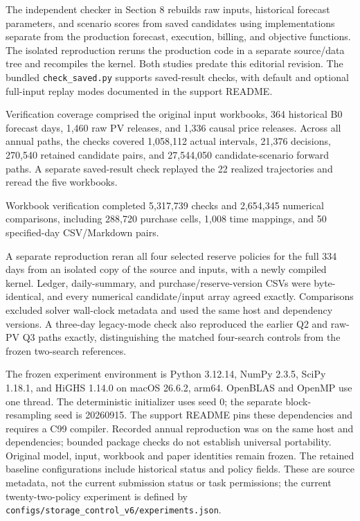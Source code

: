 The independent checker in Section 8 rebuilds raw inputs, historical forecast parameters, and scenario scores from saved candidates using implementations separate from the production forecast, execution, billing, and objective functions. The isolated reproduction reruns the production code in a separate source/data tree and recompiles the kernel. Both studies predate this editorial revision. The bundled \nolinkurl{check_saved.py} supports saved-result checks, with default and optional full-input replay modes documented in the support README.

Verification coverage comprised the original input workbooks, 364 historical B0 forecast days, 1,460 raw PV releases, and 1,336 causal price releases. Across all annual paths, the checks covered 1,058,112 actual intervals, 21,376 decisions, 270,540 retained candidate pairs, and 27,544,050 candidate-scenario forward paths. A separate saved-result check replayed the 22 realized trajectories and reread the five workbooks.

Workbook verification completed 5,317,739 checks and 2,654,345 numerical comparisons, including 288,720 purchase cells, 1,008 time mappings, and 50 specified-day CSV/Markdown pairs.

A separate reproduction reran all four selected reserve policies for the full 334 days from an isolated copy of the source and inputs, with a newly compiled kernel. Ledger, daily-summary, and purchase/reserve-version CSVs were byte-identical, and every numerical candidate/input array agreed exactly. Comparisons excluded solver wall-clock metadata and used the same host and dependency versions. A three-day legacy-mode check also reproduced the earlier Q2 and raw-PV Q3 paths exactly, distinguishing the matched four-search controls from the frozen two-search references.

The frozen experiment environment is Python 3.12.14, NumPy 2.3.5, SciPy 1.18.1, and HiGHS 1.14.0 on macOS 26.6.2, arm64. OpenBLAS and OpenMP use one thread. The deterministic initializer uses seed 0; the separate block-resampling seed is 20260915. The support README pins these dependencies and requires a C99 compiler. Recorded annual reproduction was on the same host and dependencies; bounded package checks do not establish universal portability. Original model, input, workbook and paper identities remain frozen. The retained baseline configurations include historical status and policy fields. These are source metadata, not the current submission status or task permissions; the current twenty-two-policy experiment is defined by \nolinkurl{configs/storage_control_v6/experiments.json}.

